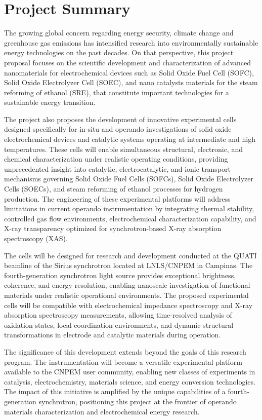 \section{Project Summary}

The growing global concern regarding energy security, climate change and greenhouse gas emissions has intensified research into environmentally sustainable energy technologies on the past decades. On that perspective, this project proposal focuses on the scientific development and characterization of advanced nanomaterials for electrochemical devices such as Solid Oxide Fuel Cell (SOFC), Solid Oxide Electrolyzer Cell (SOEC), and nano catalysts materials for the steam reforming of ethanol (SRE), that constitute important technologies for a sustainable energy transition. 

The project also proposes the development of innovative experimental cells designed specifically for in-situ and operando investigations of solid oxide electrochemical devices and catalytic systems operating at intermediate and high temperatures. These cells will enable simultaneous structural, electronic, and chemical characterization under realistic operating conditions, providing unprecedented insight into catalytic, electrocatalytic, and ionic transport mechanisms governing Solid Oxide Fuel Cells (SOFCs), Solid Oxide Electrolyzer Cells (SOECs), and steam reforming of ethanol  processes for hydrogen production. The engineering of these experimental platforms will address limitations in current operando instrumentation by integrating thermal stability, controlled gas flow environments, electrochemical characterization capability, and X-ray transparency optimized for synchrotron-based X-ray absorption spectroscopy (XAS).

The cells will be designed for research and development conducted at the QUATI beamline of the Sirius synchrotron located at LNLS/CNPEM in Campinas. The fourth-generation synchrotron light source provides exceptional brightness, coherence, and energy resolution, enabling nanoscale investigation of functional materials under realistic operational environments. The proposed experimental cells will be compatible with electrochemical impedance spectroscopy and X-ray absorption spectroscopy measurements, allowing time-resolved analysis of oxidation states, local coordination environments, and dynamic structural transformations in electrode and catalytic materials during operation.

The significance of this development extends beyond the goals of this research program. The instrumentation will become a versatile experimental platform available to the CNPEM user community, enabling new classes of experiments in catalysis, electrochemistry, materials science, and energy conversion technologies. The impact of this initiative is amplified by the unique capabilities of a fourth-generation synchrotron, positioning this project at the frontier of operando materials characterization and electrochemical energy research.





